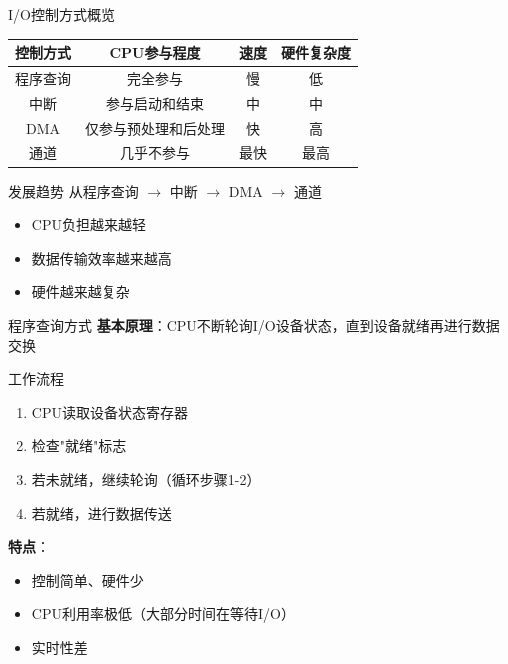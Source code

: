 \documentclass[10pt, aspectratio=169]{beamer}
\begin{document}
\begin{frame}{I/O控制方式概览}
    \begin{center}
        \begin{tabular}{|c|c|c|c|}
            \hline
            \textbf{控制方式} & \textbf{CPU参与程度} & \textbf{速度} & \textbf{硬件复杂度} \\
            \hline
            程序查询 & 完全参与 & 慢 & 低 \\
            中断 & 参与启动和结束 & 中 & 中 \\
            DMA & 仅参与预处理和后处理 & 快 & 高 \\
            通道 & 几乎不参与 & 最快 & 最高 \\
            \hline
        \end{tabular}
    \end{center}
    \vspace{0.5em}
    \begin{block}{发展趋势}
        从程序查询 $\rightarrow$ 中断 $\rightarrow$ DMA $\rightarrow$ 通道
        \begin{itemize}
            \item CPU负担越来越轻
            \item 数据传输效率越来越高
            \item 硬件越来越复杂
        \end{itemize}
    \end{block}
\end{frame}

\begin{frame}{程序查询方式}
    \textbf{基本原理}：CPU不断轮询I/O设备状态，直到设备就绪再进行数据交换
    \vspace{0.3em}
    \begin{block}{工作流程}
        \begin{enumerate}
            \item CPU读取设备状态寄存器
            \item 检查"就绪"标志
            \item 若未就绪，继续轮询（循环步骤1-2）
            \item 若就绪，进行数据传送
        \end{enumerate}
    \end{block}
    \vspace{0.3em}
    \textbf{特点}：
    \begin{itemize}
        \item[+] 控制简单、硬件少
        \item[-] CPU利用率极低（大部分时间在等待I/O）
        \item[-] 实时性差
    \end{itemize}
\end{frame}
\end{document}

